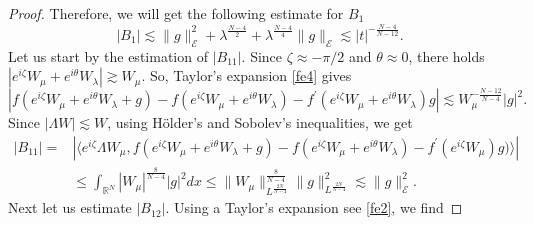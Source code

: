 \documentclass[a4paper,two-side,10pt]{amsart}
\newcommand{\R}{\mathbb{R}}
\numberwithin{equation}{section}
\begin{document}
\begin{proof}
Therefore, we will get the following estimate for $B_1$ 
$$|B_1|\lesssim  \|g\|_{\mathcal{E}}^2+\lambda^{\frac{N-4}{2}}+ \lambda^{\frac{N-4}{4}} \|g\|_{\mathcal{E}}\lesssim 
|t|^{-\frac{N-4}{N-12}}.$$
Let us start by the estimation of $|B_{11}|$. Since $\zeta \approx -\pi /2$ and $\theta \approx 0$, there holds $|e^{i\zeta }W_\mu +e^{i\theta} W_\lambda | \gtrsim W_\mu$. So, Taylor's expansion \eqref{fe4} gives
$$|f(e^{i\zeta} W_\mu +e^{i\theta} W_\lambda +g) - f(e^{i\zeta} W_\mu +e^{i\theta} W_\lambda) - f^\prime (e^{i\zeta} W_\mu +e^{i\theta} W_\lambda) g |\lesssim W_\mu^{- \frac{N -12}{N-4}} |g|^2  .$$
Since $|\Lambda W|\lesssim W$, using H\"older's and Sobolev's inequalities, we get
\begin{align}\label{b11}
|B_{11}|=& |\langle   e^{i\zeta} \Lambda W_\mu ,  f(e^{i\zeta} W_\mu +e^{i\theta} W_\lambda +g) - f(e^{i\zeta} W_\mu +e^{i\theta} W_\lambda) - f^\prime (e^{i\zeta} W_\mu) g) \rangle |\nonumber\\
& \leq \int_{\R^N} |W_\mu|^{\frac{8}{N-4}} |g|^2 dx \leq  \|W_\mu \|_{L^{\frac{2N}{N-4}}}^{\frac{8}{N-4}} \|g\|_{L^{\frac{2N}{N-4}}}^2 \lesssim \|g\|_{\mathcal{E}}^2  .
\end{align}
Next let us estimate $|B_{12}|$. Using a Taylor's expansion see \eqref{fe2}, we find


\end{proof}
\end{document}
